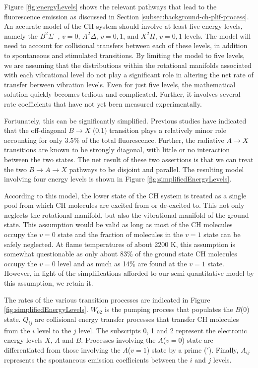 Figure \ref{fig:energyLevels} shows the relevant pathways that lead to the fluorescence emission as discussed in Section \ref{subsec:background-ch-plif-process}.
An accurate model of the CH system should involve at least five energy levels, namely the \(B^2\Sigma^-\), \(v=0\), \(A^2\Delta\), \(v=0,1\), and \(X^2\Pi\), \(v=0,1\) levels.
The model will need to account for collisional transfers between each of these levels, in addition to spontaneous and stimulated transitions.
By limiting the model to five levels, we are assuming that the distributions within the rotational manifolds associated with each vibrational level do not play a significant role in altering the net rate of transfer between vibration levels.
Even for just five levels, the mathematical solution quickly becomes tedious and complicated.
Further, it involves several rate coefficients that have not yet been measured experimentally.

Fortunately, this can be significantly simplified.
Previous studies\cite{1996-luque-c,2000-luque} have indicated that the off-diagonal \(B\rightarrow X\) (0,1) transition plays a relatively minor role accounting for only 3.5\% of the total fluorescence.
Further, the radiative \(A\rightarrow X\) transitions are known\cite{1996-luque-b} to be strongly diagonal, with little or no interaction\cite{1985-garland-b} between the two states.
The net result of these two assertions is that we can treat the two \(B\rightarrow A\rightarrow X\) pathways to be disjoint and parallel.
The resulting model involving four energy levels is shown in Figure \ref{fig:simplifiedEnergyLevels}.



According to this model, the lower state of the CH system is treated as a single pool from which CH molecules are excited from or de-excited to.
This not only neglects the rotational manifold, but also the vibrational manifold of the ground state.
This assumption would be valid as long as most of the CH molecules occupy the \(v=0\) state and the fraction of molecules in the \(v=1\) state can be safely neglected.
At flame temperatures of about 2200 K, this assumption is somewhat questionable as only about 83\% of the ground state CH molecules occupy the \(v=0\) level and as much as 14\% are found at the \(v=1\) state.
However, in light of the simplifications afforded to our semi-quantitative model by this assumption, we retain it.

The rates of the various transition processes are indicated in Figure \ref{fig:simplifiedEnergyLevels}.
\(W_{02}\) is the pumping process that populates the \(B\)(0) state.
\(Q_{ij}\) are collisional energy transfer processes that transfer CH molecules from the \(i\) level to the \(j\) level.
The subscripts 0, 1 and 2 represent the electronic energy levels \(X\), \(A\) and \(B\).
Processes involving the \(A\)(\(v=0\)) state are differentiated from those involving the \(A\)(\(v=1\)) state by a prime (\('\)).
Finally, \(A_{ij}\) represents the spontaneous emission coefficients between the \(i\) and \(j\) levels.

